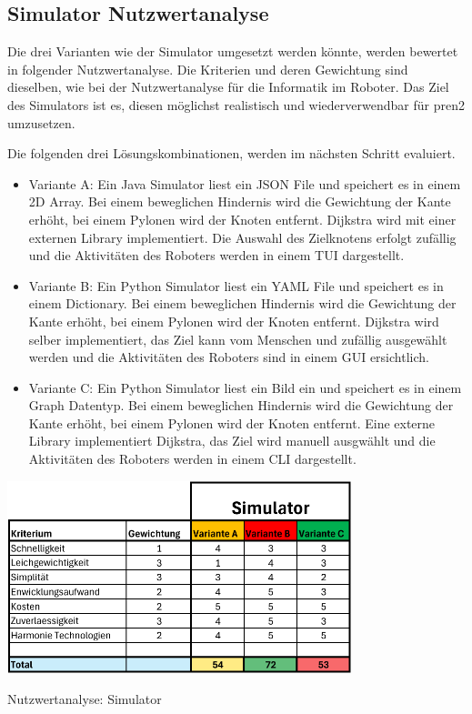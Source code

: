 \subsection{Simulator Nutzwertanalyse}

Die drei Varianten wie der Simulator umgesetzt werden könnte, werden bewertet in folgender Nutzwertanalyse. Die Kriterien und deren Gewichtung sind dieselben, wie bei der Nutzwertanalyse für die Informatik im Roboter. Das Ziel des Simulators ist es, diesen möglichst realistisch und wiederverwendbar für \acrshort{pren2} umzusetzen.


Die folgenden drei Lösungskombinationen, werden im nächsten Schritt evaluiert.

\begin{itemize}
    \item Variante A: Ein Java Simulator liest ein JSON File und speichert es in einem 2D Array. Bei einem beweglichen Hindernis wird die Gewichtung der Kante erhöht, bei einem Pylonen wird der Knoten entfernt. Dijkstra wird mit einer externen Library implementiert. Die Auswahl des Zielknotens erfolgt zufällig und die Aktivitäten des Roboters werden in einem TUI dargestellt.
    \item Variante B: Ein Python Simulator liest ein YAML File und speichert es in einem Dictionary. Bei einem beweglichen Hindernis wird die Gewichtung der Kante erhöht, bei einem Pylonen wird der Knoten entfernt. Dijkstra wird selber implementiert, das Ziel kann vom Menschen und zufällig ausgewählt werden und die Aktivitäten des Roboters sind in einem GUI ersichtlich.
    \item Variante C: Ein Python Simulator liest ein Bild ein und speichert es in einem Graph Datentyp. Bei einem beweglichen Hindernis wird die Gewichtung der Kante erhöht, bei einem Pylonen wird der Knoten entfernt. Eine externe Library implementiert Dijkstra, das Ziel wird manuell ausgwählt und die Aktivitäten des Roboters werden in einem CLI dargestellt.
\end{itemize}

\begin{table}[H]
\centering
\includegraphics[width=0.75\textwidth]{assets/Nutzwertanalyse-Simulator.pdf}
\caption{Nutzwertanalyse: Simulator}
\label{table:nutzwert-Simulator}
\end{table}

